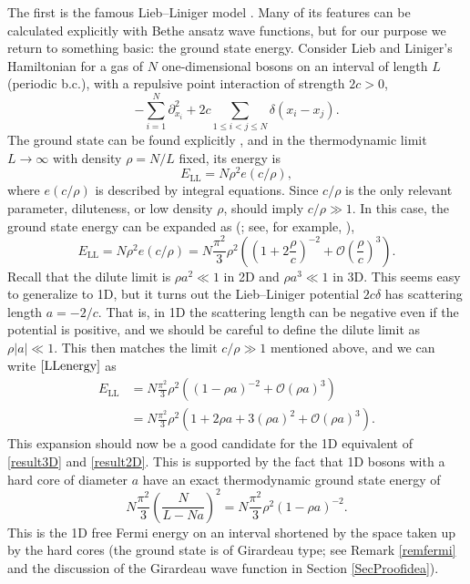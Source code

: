 \documentclass[a4paper,11pt]{article}
\numberwithin{equation}{section}
\begin{document}
	The first is the famous Lieb--Liniger model \cite{lieb1963exact}. Many of its features can be calculated explicitly with Bethe ansatz wave functions, but for our purpose we return to something basic: the ground state energy.
	Consider Lieb and Liniger's Hamiltonian for a gas of $N$ one-dimensional bosons on an interval of length $L$ (periodic b.c.), with a repulsive point interaction of strength $2c>0$, 
	\begin{equation}
		\label{LLmodel}
		-\sum^N_{i=1}\partial^2_{x_i}+2c\sum_{1\leq i<j\leq N}\delta(x_i-x_j).
	\end{equation}
	The ground state can be found explicitly \cite{lieb1963exact}, and in the thermodynamic limit $L\to\infty$ with density $\rho=N/L$ fixed, its energy is
	\begin{equation}
		\label{LLtherm}
		E_{\text{LL}}=N\rho^2 e(c/\rho),
	\end{equation}
	where $e(c/\rho)$ is described by integral equations.
	Since $c/\rho$ is the only relevant parameter, diluteness, or low density $\rho$, should imply $c/\rho\gg1$. In this case, the ground state energy can be expanded as (\cite{lieb1963exact}; see, for example, \cite{guan2011polylogs,jiang2015understanding}),
	\begin{equation}
		\label{LLenergy}
		E_{\text{LL}}=N\rho^2 e(c/\rho)=N\frac{\pi^2}{3}\rho^2\left(\left(1+2\frac{\rho}{c}\right)^{-2}+\mathcal{O}\left(\frac{\rho}{c}\right)^3\right).
	\end{equation}
	Recall that the dilute limit is $\rho a^2\ll1$ in 2D and $\rho a^3\ll1$ in 3D. This seems easy to generalize to 1D, but it turns out the Lieb--Liniger potential $2c\delta$ has scattering length $a=-2/c$. That is, in 1D the scattering length can be negative even if the potential is positive, and we should be careful to define the dilute limit as $\rho|a|\ll1$. This then matches the limit $c/\rho\gg1$ mentioned above, and we can write $\eqref{LLenergy}$ as
	\begin{equation}
		\label{LLenergyina}
		\begin{aligned}
			E_{\text{LL}}&=N\frac{\pi^2}{3}\rho^2\left(\left(1-\rho a\right)^{-2}+\mathcal{O}(\rho a)^3\right)\\
			&=N\frac{\pi^2}{3}\rho^2\left(1+2\rho a+3(\rho a)^2+\mathcal{O}(\rho a)^3\right).
		\end{aligned}
	\end{equation}
	This expansion should now be a good candidate for the 1D equivalent of \eqref{result3D} and \eqref{result2D}. This is supported by the fact that 1D bosons with a hard core of diameter $a$ have an exact thermodynamic ground state energy of \cite{girardeau1960relationship,astrakharchik2010low}
	\begin{equation}
		\label{eqhardcore}
		N\frac{\pi^2}{3}\left(\frac{N}{L-Na}\right)^2=N\frac{\pi^2}{3}\rho^2\left(1-\rho a\right)^{-2}.
	\end{equation}
	This is the 1D free Fermi energy on an interval shortened by the space taken up by the hard cores (the ground state is of Girardeau type; see Remark \ref{remfermi} and the discussion of the Girardeau wave function in Section \ref{SecProofidea}).
	
\end{document}
